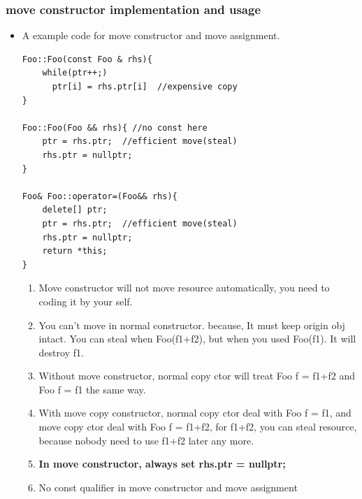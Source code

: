 \documentclass[a4paper,11pt,twoside]{book}
\begin{document}
\subsubsection{move constructor implementation and usage}
\begin{itemize}
	\item A example code for move constructor and move assignment.	
\begin{lstlisting}[numbers=none]
Foo::Foo(const Foo & rhs){
	while(ptr++;)
	  ptr[i] = rhs.ptr[i]  //expensive copy
}

Foo::Foo(Foo && rhs){ //no const here
	ptr = rhs.ptr;  //efficient move(steal)
	rhs.ptr = nullptr;
}

Foo& Foo::operator=(Foo&& rhs){
	delete[] ptr;
	ptr = rhs.ptr;  //efficient move(steal)
	rhs.ptr = nullptr;
	return *this;
}
\end{lstlisting}
	

	
	\begin{enumerate}
		\item Move constructor will not move resource automatically, you need to coding it by your self.
		
		\item You can't move in normal constructor. because, It must keep origin obj intact.  You can steal when Foo(f1+f2), but when you used Foo(f1).  It will destroy f1.
		
		\item Without  move constructor, normal copy ctor will treat Foo f = f1+f2 and Foo f = f1 the same way.
		
		\item With move copy constructor, normal copy ctor deal with Foo f = f1, and move copy ctor deal with Foo f = f1+f2, for f1+f2, you can steal resource, because nobody need to use f1+f2 later any more.
		
		\item \textbf{In move constructor, always set rhs.ptr = nullptr;}
		
		\item No const qualifier in move constructor and move assignment
		
	\end{enumerate}
	

\end{itemize}
\end{document}
